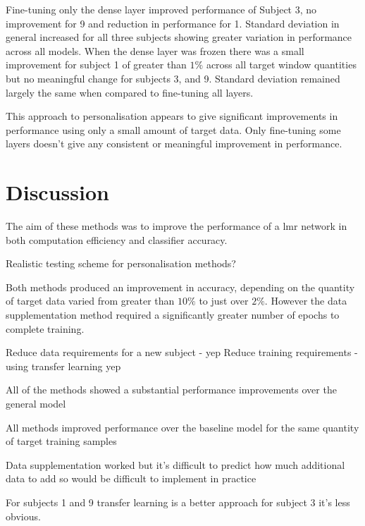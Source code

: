 Fine-tuning only the dense layer improved performance of Subject 3, no improvement for 9 and reduction in performance for 1. Standard deviation in general increased for all three subjects showing greater variation in performance across all models. When the dense layer was frozen there was a small improvement for subject 1 of greater than $1\%$ across all target window quantities but no meaningful change for subjects 3, and 9. Standard deviation remained largely the same when compared to fine-tuning all layers.

This approach to personalisation appears to give significant improvements in performance using only a small amount of target data. Only fine-tuning some layers doesn't give any consistent or meaningful improvement in performance.

\section{Discussion}
\label{sec:personalisation-discussion}
The aim of these methods was to improve the performance of a \acrshort{lmr} network in both computation efficiency and classifier accuracy. 

Realistic testing scheme for personalisation methods?



Both methods produced an improvement in accuracy, depending on the quantity of target data varied from greater than $10\%$ to just over $2\%$. However the data supplementation method required a significantly greater number of epochs to complete training.

Reduce data requirements for a new subject - yep
Reduce training requirements - using transfer learning yep

All of the methods showed a substantial performance improvements over the general model

All methods improved performance over the baseline model for the same quantity of target training samples

Data supplementation worked but it's difficult to predict how much additional data to add so would be difficult to implement in practice

For subjects 1 and 9 transfer learning is a better approach for subject 3 it's less obvious.



